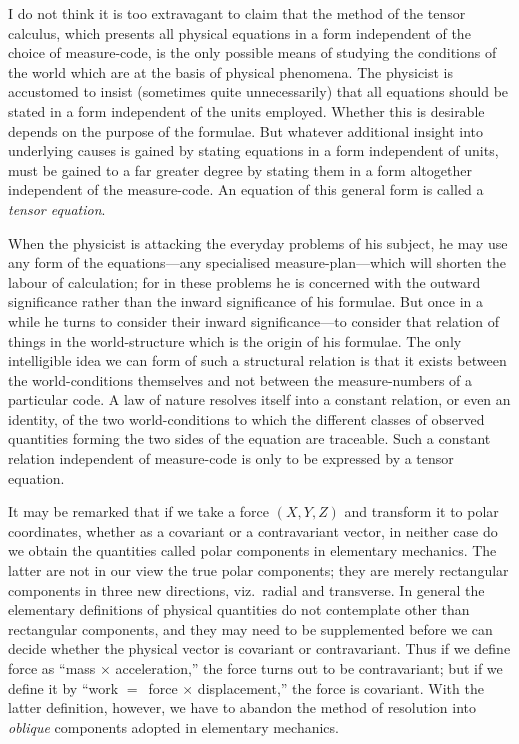 \documentclass[12pt]{book}
\begin{document}
I do not think it is too extravagant to claim that the method of the tensor
%
calculus, which presents all physical equations in a form independent of the
choice of measure-code, is the only possible means of studying the conditions
of the world which are at the basis of physical phenomena. The physicist is
accustomed to insist (sometimes quite unnecessarily) that all equations should
be stated in a form independent of the units employed. Whether this is
desirable depends on the purpose of the formulae. But whatever additional
insight into underlying causes is gained by stating equations in a form independent
of units, must be gained to a far greater degree by stating them in
a form altogether independent of the measure-code. An equation of this
general form is called a \emph{tensor equation}.

When the physicist is attacking the everyday problems of his subject, he
may use any form of the equations---any specialised measure-plan---which
will shorten the labour of calculation; for in these problems he is concerned
with the outward significance rather than the inward significance of his
formulae. But once in a while he turns to consider their inward significance---to
consider that relation of things in the world-structure which is the
origin of his formulae. The only intelligible idea we can form of such a
structural relation is that it exists between the world-conditions themselves
and not between the measure-numbers of a particular code. A law of nature
resolves itself into a constant relation, or even an identity, of the two world-conditions
to which the different classes of observed quantities forming the
two sides of the equation are traceable. Such a constant relation independent
of measure-code is only to be expressed by a tensor equation.

It may be remarked that if we take a force $(X, Y, Z)$ and transform it to
%
polar coordinates, whether as a covariant or a contravariant vector, in neither
case do we obtain the quantities called polar components in elementary
mechanics. The latter are not in our view the true polar components; they
are merely rectangular components in three new directions, viz.\ radial and
transverse. In general the elementary definitions of physical quantities do
not contemplate other than rectangular components, and they may need to
be supplemented before we can decide whether the physical vector is covariant
or contravariant. Thus if we define force as ``mass $\times$ acceleration,'' the force
turns out to be contravariant; but if we define it by ``work $=$~force $\times$ displacement,''
the force is covariant. With the latter definition, however, we have
to abandon the method of resolution into \emph{oblique} components adopted in
elementary mechanics.
\end{document}
